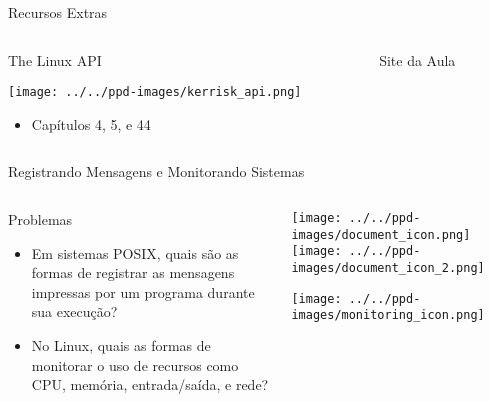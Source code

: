 \documentclass[10pt, compress, aspectratio=169, xcolor={table,usenames,dvipsnames}]{beamer}
\begin{document}
\begin{frame}[label={sec:orgce65d37}]{Recursos Extras}
\begin{columns}
\begin{column}{0.5\columnwidth}
\begin{block}{The Linux API}
\begin{center}
\texttt{[image: ../../ppd-images/kerrisk\_api.png]}
\end{center}

\begin{itemize}
\item Capítulos 4, 5, e 44
\end{itemize}
\end{block}
\end{column}

\begin{column}{0.5\columnwidth}
\begin{block}{Site da Aula}
\end{block}
\end{column}
\end{columns}
\end{frame}
\begin{frame}[label={sec:org82c5849}]{Registrando Mensagens e Monitorando Sistemas}
\begin{columns}
\begin{column}{0.6\columnwidth}
\begin{block}{Problemas}
\begin{itemize}
\item Em sistemas POSIX,  quais são as formas de \alert{registrar  as mensagens impressas}
por um programa durante sua execução?
\item No Linux, quais as formas de \alert{monitorar  o uso de recursos} como CPU, memória,
entrada/saída, e rede?
\end{itemize}
\end{block}
\end{column}
\begin{column}{0.4\columnwidth}
\begin{center}
  \texttt{[image: ../../ppd-images/document\_icon.png]}
  \texttt{[image: ../../ppd-images/document\_icon\_2.png]}

  \vspace{1em}

  \texttt{[image: ../../ppd-images/monitoring\_icon.png]}
\end{center}
\end{column}
\end{columns}
\end{frame}
\end{document}
